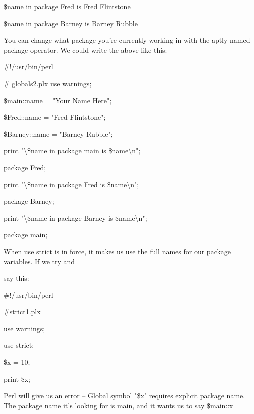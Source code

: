 \documentclass[a4paper,11pt]{book}
\begin{document}
\noindent \$name in package Fred   is Fred Flintstone

\noindent \$name in package Barney is Barney Rubble

\noindent 

\noindent You can change what package you're currently working in with the aptly named package operator. We could write the above like this:

\noindent 

\noindent \#!/usr/bin/perl

\noindent \# globals2.plx use warnings;

\noindent \$main::name = "Your Name Here";

\noindent \$Fred::name = "Fred Flintstone";

\noindent \$Barney::name = "Barney Rubble";

\noindent 

\noindent print "\textbackslash \$name in package main is \$name\textbackslash n";

\noindent package Fred;

\noindent print "\textbackslash \$name in package Fred is \$name\textbackslash n";

\noindent package Barney;

\noindent print "\textbackslash \$name in package Barney is \$name\textbackslash n";

\noindent package main;

\noindent 

\noindent 

\noindent When use strict is in force, it makes us use the full names for our package variables. If we try and

\noindent say this:

\noindent 

\noindent 

\noindent \#!/usr/bin/perl

\noindent \#strict1.plx

\noindent use warnings;

\noindent use strict;

\noindent \$x = 10;

\noindent print \$x;

\noindent 

\noindent Perl will give us an error -- Global symbol "\$x" requires explicit package name. The package name it's looking for is main, and it wants us to say \$main::x

\noindent 
\end{document}
